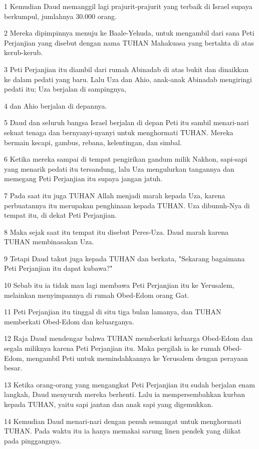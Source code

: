 \par 1 Kemudian Daud memanggil lagi prajurit-prajurit yang terbaik di Israel supaya berkumpul, jumlahnya 30.000 orang.
\par 2 Mereka dipimpinnya menuju ke Baale-Yehuda, untuk mengambil dari sana Peti Perjanjian yang disebut dengan nama TUHAN Mahakuasa yang bertahta di atas kerub-kerub.
\par 3 Peti Perjanjian itu diambil dari rumah Abinadab di atas bukit dan dinaikkan ke dalam pedati yang baru. Lalu Uza dan Ahio, anak-anak Abinadab mengiringi pedati itu; Uza berjalan di sampingnya,
\par 4 dan Ahio berjalan di depannya.
\par 5 Daud dan seluruh bangsa Israel berjalan di depan Peti itu sambil menari-nari sekuat tenaga dan bernyanyi-nyanyi untuk menghormati TUHAN. Mereka bermain kecapi, gambus, rebana, kelentingan, dan simbal.
\par 6 Ketika mereka sampai di tempat pengirikan gandum milik Nakhon, sapi-sapi yang menarik pedati itu tersandung, lalu Uza mengulurkan tangannya dan memegang Peti Perjanjian itu supaya jangan jatuh.
\par 7 Pada saat itu juga TUHAN Allah menjadi marah kepada Uza, karena perbuatannya itu merupakan penghinaan kepada TUHAN. Uza dibunuh-Nya di tempat itu, di dekat Peti Perjanjian.
\par 8 Maka sejak saat itu tempat itu disebut Peres-Uza. Daud marah karena TUHAN membinasakan Uza.
\par 9 Tetapi Daud takut juga kepada TUHAN dan berkata, "Sekarang bagaimana Peti Perjanjian itu dapat kubawa?"
\par 10 Sebab itu ia tidak mau lagi membawa Peti Perjanjian itu ke Yerusalem, melainkan menyimpannya di rumah Obed-Edom orang Gat.
\par 11 Peti Perjanjian itu tinggal di situ tiga bulan lamanya, dan TUHAN memberkati Obed-Edom dan keluarganya.
\par 12 Raja Daud mendengar bahwa TUHAN memberkati keluarga Obed-Edom dan segala miliknya karena Peti Perjanjian itu. Maka pergilah ia ke rumah Obed-Edom, mengambil Peti untuk memindahkannya ke Yerusalem dengan perayaan besar.
\par 13 Ketika orang-orang yang mengangkat Peti Perjanjian itu sudah berjalan enam langkah, Daud menyuruh mereka berhenti. Lalu ia mempersembahkan kurban kepada TUHAN, yaitu sapi jantan dan anak sapi yang digemukkan.
\par 14 Kemudian Daud menari-nari dengan penuh semangat untuk menghormati TUHAN. Pada waktu itu ia hanya memakai sarung linen pendek yang diikat pada pinggangnya.
